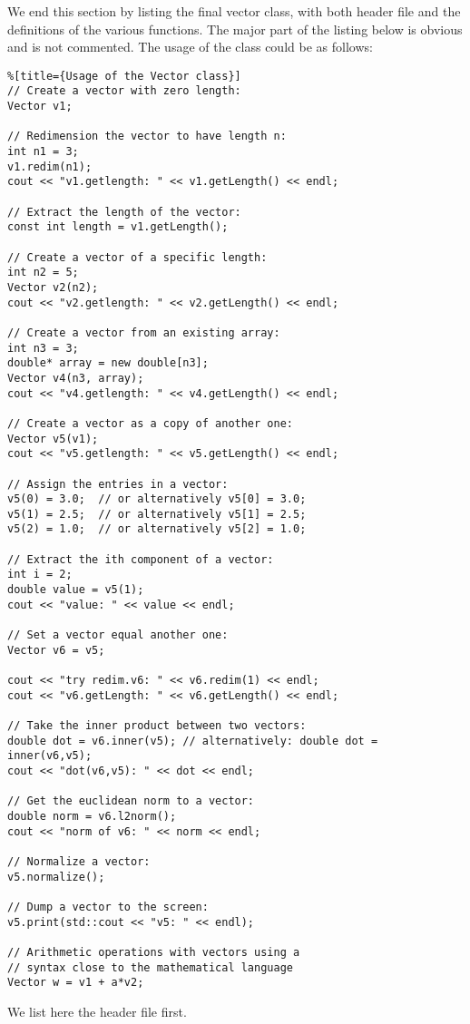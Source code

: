 We end this section by listing the final vector class, with both header file and the definitions of the various functions.
The major part of the listing below is obvious and is not commented. The usage of the class could be as follows:
\begin{lstlisting}%[title={Usage of the Vector class}]
// Create a vector with zero length:
Vector v1;

// Redimension the vector to have length n:
int n1 = 3;
v1.redim(n1);
cout << "v1.getlength: " << v1.getLength() << endl;

// Extract the length of the vector:
const int length = v1.getLength();

// Create a vector of a specific length:
int n2 = 5;
Vector v2(n2);
cout << "v2.getlength: " << v2.getLength() << endl;

// Create a vector from an existing array:
int n3 = 3;
double* array = new double[n3];
Vector v4(n3, array);
cout << "v4.getlength: " << v4.getLength() << endl;

// Create a vector as a copy of another one:
Vector v5(v1);
cout << "v5.getlength: " << v5.getLength() << endl;

// Assign the entries in a vector:
v5(0) = 3.0;  // or alternatively v5[0] = 3.0;
v5(1) = 2.5;  // or alternatively v5[1] = 2.5;
v5(2) = 1.0;  // or alternatively v5[2] = 1.0;

// Extract the ith component of a vector:
int i = 2;
double value = v5(1);
cout << "value: " << value << endl;

// Set a vector equal another one:
Vector v6 = v5;

cout << "try redim.v6: " << v6.redim(1) << endl;
cout << "v6.getLength: " << v6.getLength() << endl;

// Take the inner product between two vectors:
double dot = v6.inner(v5); // alternatively: double dot = inner(v6,v5);
cout << "dot(v6,v5): " << dot << endl;

// Get the euclidean norm to a vector:
double norm = v6.l2norm();
cout << "norm of v6: " << norm << endl;

// Normalize a vector:
v5.normalize();

// Dump a vector to the screen:
v5.print(std::cout << "v5: " << endl);

// Arithmetic operations with vectors using a 
// syntax close to the mathematical language
Vector w = v1 + a*v2;
\end{lstlisting}
We list here the header file first.
